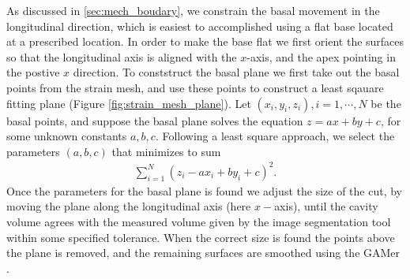 As discussed in \ref{sec:mech_boudary}, we constrain the basal movement in
the longitudinal direction, which is easiest to accomplished using a flat
base located at a prescribed location. In order to make the base flat
we first orient the surfaces so that the longitudinal axis is aligned
with the $x$-axis, and the apex pointing in the postive $x$
direction. To conststruct the basal plane we first take out the basal
points from the strain mesh, and use these points to construct a least
sqauare fitting plane (Figure \ref{fig:strain_mesh_plane}). Let $(x_i, y_i, z_i), i = 1, \cdots, N$
be the basal points, and suppose the basal plane solves the equation
$z = ax + by + c$, for some unknown constants $a,b,c$. Following a
least square approach, we select the parameters $(a,b,c)$ that
minimizes to sum
\begin{align}
  \sum_{i = 1}^{N} \left( z_i - ax_i + by_i + c \right)^2.
\end{align}
Once the parameters for the basal plane is found we adjust the size of
the cut, by moving the plane along the longitudinal axis (here
$x-$axis), until the cavity volume agrees with the measured volume
given by the image segmentation tool within some specified tolerance. 
When the correct size is found the points above the plane is removed,
and the remaining surfaces are smoothed using the GAMer
\cite{yu2008feature}.


